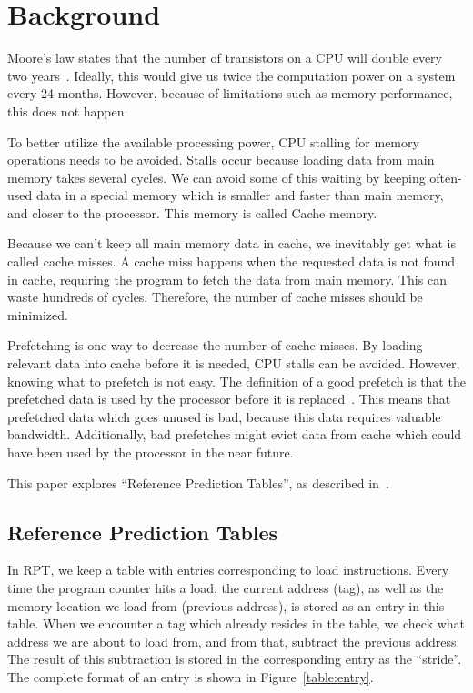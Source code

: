 \section{Background} %


Moore's law states that the number of transistors on a CPU will double
every two years~\cite{moore}. Ideally, this would give us twice the
computation power on a system every 24 months. However, because of
limitations such as memory performance, this does not happen.

To better utilize the available processing power, CPU stalling for
memory operations needs to be avoided. Stalls occur because loading
data from main memory takes several cycles. We can avoid some of this
waiting by keeping often-used data in a special memory which is
smaller and faster than main memory, and closer to the processor. This
memory is called Cache memory.

Because we can't keep all main memory data in cache, we inevitably get
what is called cache misses. A cache miss happens when the requested
data is not found in cache, requiring the program to fetch the data
from main memory. This can waste hundreds of cycles. Therefore, the
number of cache misses should be minimized.

Prefetching is one way to decrease the number of cache misses. By
loading relevant data into cache before it is needed, CPU stalls can
be avoided. However, knowing what to prefetch is not easy. The
definition of a good prefetch is that the prefetched data is used by
the processor before it is
replaced~\cite{srinivasan_davidson_tyson_2004}. This means that
prefetched data which goes unused is bad, because this data requires
valuable bandwidth. Additionally, bad prefetches might evict data from
cache which could have been used by the processor in the near future.

This paper explores ``Reference Prediction Tables'', as
described in~\cite{chen_baer_1995}.

\subsection{Reference Prediction Tables}

In RPT, we keep a table with entries corresponding to load
instructions. Every time the program counter hits a load, the current
address (tag), as well as the memory location we load from (previous
address), is stored as an entry in this table. When we encounter a tag
which already resides in the table, we check what address we are about
to load from, and from that, subtract the previous address. The result
of this subtraction is stored in the corresponding entry as the
``stride''. The complete format of an entry is shown in
Figure~\ref{table:entry}.

